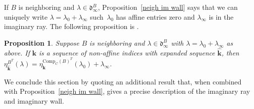 \documentclass{amsart}
\newtheorem{proposition}{Proposition}[section]
\theoremstyle{definition}
\theoremstyle{remark}
\numberwithin{equation}{section}
\newcommand{\0}{{\mathbf{0}}}
\newcommand{\Comp}{\mathrm{Comp}_C}
\newcommand{\kk}{{\boldsymbol{k}}}
\renewcommand{\d}{{\mathfrak d}}
\begin{document}
If $B$ is neighboring and  $\lambda\in\d_\infty^B$, Proposition~\ref{neigh im wall} says that we can uniquely write $\lambda=\lambda_0+\lambda_\infty$ such~$\lambda_0$ has affine entries zero and $\lambda_\infty$ is in the imaginary ray.
The following proposition is \cite[Proposiion~4.55]{affdomreg}.

\begin{proposition}\label{factor eta}
Suppose $B$ is neighboring and $\lambda\in\d_\infty^B$ with $\lambda=\lambda_0+\lambda_\infty$ as above.
If $\kk$ is a sequence of non-affine indices with expanded sequence $\widehat\kk$, then ${\eta^{B^T}_{\widehat\kk}(\lambda)=\eta_\kk^{\Comp(B)^T}(\lambda_0)+\lambda_\infty}$.
\end{proposition}

We conclude this section by quoting an additional result \cite[Proposition~4.49]{affdomreg} that, when combined with Proposition~\ref{neigh im wall}, gives a precise description of the imaginary ray and imaginary wall.

\pagebreak[4]
\end{document}
